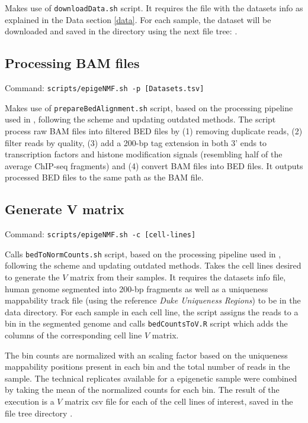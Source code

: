 Makes use of \texttt{downloadData.sh} script. It requires the file with the datasets info as explained in the Data section \ref{data}. For each sample, the dataset will be downloaded and saved in the  directory using the next file tree: .

\subsection{Processing BAM files}

Command: \texttt{scripts/epigeNMF.sh -p [Datasets.tsv]}

\smallskip

Makes use of \texttt{prepareBedAlignment.sh} script, based on the processing pipeline used in \cite{Gandolfi2017}, following the scheme and updating outdated methods. The script process raw BAM files into filtered BED files by (1) removing duplicate reads, (2) filter reads by quality, (3) add a 200-bp tag extension in both 3' ends to transcription factors and histone modification signals (resembling half of the average ChIP-seq fragments) and (4) convert BAM files into BED files. It outputs processed BED files to the same path as the BAM file.

\subsection{Generate V matrix}

Command: \texttt{scripts/epigeNMF.sh -c [cell-lines]}

\smallskip

Calls \texttt{bedToNormCounts.sh} script, based on the processing pipeline used in \cite{Gandolfi2017}, following the scheme and updating outdated methods. Takes the cell lines desired to generate the \(V\) matrix from their samples. It requires the datasets info file, human genome segmented into 200-bp fragments as well as a uniqueness mappability track file (using the reference \textit{Duke Uniqueness Regions}) to be in the data directory. For each sample in each cell line, the script assigns the reads to a bin in the segmented genome and calls \texttt{bedCountsToV.R} script which adds the columns of the corresponding cell line \(V\) matrix.

\medskip

The bin counts are normalized with an scaling factor based on the uniqueness mappability positions present in each bin and the total number of reads in the sample. The technical replicates available for a epigenetic sample were combined by taking the mean of the normalized counts for each bin. The result of the execution is a \(V\) matrix csv file for each of the cell lines of interest, saved in the file tree directory .

